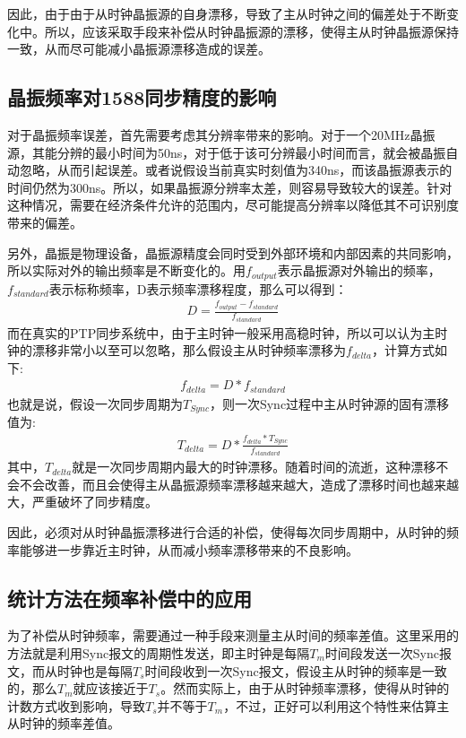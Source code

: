 因此，由于由于从时钟晶振源的自身漂移，导致了主从时钟之间的偏差处于不断变化中。所以，应该采取手段来补偿从时钟晶振源的漂移，使得主从时钟晶振源保持一致，从而尽可能减小晶振源漂移造成的误差。

\subsection{晶振频率对1588同步精度的影响}
对于晶振频率误差，首先需要考虑其分辨率带来的影响。对于一个20MHz晶振源，其能分辨的最小时间为50ns，对于低于该可分辨最小时间而言，就会被晶振自动忽略，从而引起误差。或者说假设当前真实时刻值为340ns，而该晶振源表示的时间仍然为300ns。所以，如果晶振源分辨率太差，则容易导致较大的误差。针对这种情况，需要在经济条件允许的范围内，尽可能提高分辨率以降低其不可识别度带来的偏差。

另外，晶振是物理设备，晶振源精度会同时受到外部环境和内部因素的共同影响，所以实际对外的输出频率是不断变化的。用$f_{output}$表示晶振源对外输出的频率，$f_{standard}$表示标称频率，D表示频率漂移程度，那么可以得到：
\begin {align}
D = \frac{f_{output} - f_{standard}}{f_{standard}}
\end{align}
而在真实的PTP同步系统中，由于主时钟一般采用高稳时钟，所以可以认为主时钟的漂移非常小以至可以忽略，那么假设主从时钟频率漂移为$f_{delta}$，计算方式如下:
\begin {align}
f_{delta} = D * f_{standard}
\end{align}
也就是说，假设一次同步周期为$T_{Sync}$，则一次Sync过程中主从时钟源的固有漂移值为:
\begin {align}
T_{delta} = D * \frac{f_{delta} * T_{Sync}}{f_{standard}}
\end{align}
其中，$T_{delta}$就是一次同步周期内最大的时钟漂移。随着时间的流逝，这种漂移不会不会改善，而且会使得主从晶振源频率漂移越来越大，造成了漂移时间也越来越大，严重破坏了同步精度。

因此，必须对从时钟晶振漂移进行合适的补偿，使得每次同步周期中，从时钟的频率能够进一步靠近主时钟，从而减小频率漂移带来的不良影响。

\subsection{统计方法在频率补偿中的应用}
为了补偿从时钟频率，需要通过一种手段来测量主从时间的频率差值。这里采用的方法就是利用Sync报文的周期性发送，即主时钟是每隔$T_{m}$时间段发送一次Sync报文，而从时钟也是每隔$T_{s}$时间段收到一次Sync报文，假设主从时钟的频率是一致的，那么$T_{m}$就应该接近于$T_{s}$。然而实际上，由于从时钟频率漂移，使得从时钟的计数方式收到影响，导致$T_{s}$并不等于$T_{m}$，不过，正好可以利用这个特性来估算主从时钟的频率差值。

